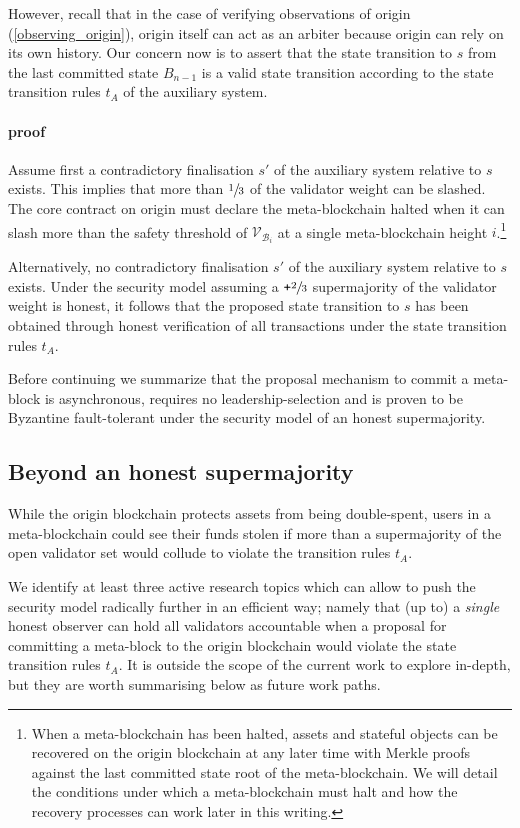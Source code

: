 \documentclass[12pt,a4paper]{article}
\begin{document}
However, recall that in the case of verifying observations of origin (\ref{observing_origin}), origin itself can act as an arbiter because origin can rely on its own history.
Our concern now is to assert that the state transition to $s$ from the last committed state $B_{n-1}$ is a valid state transition according to the state transition rules $t_A$ of the auxiliary system.

\paragraph{proof} Assume first a contradictory finalisation $s'$ of the auxiliary system relative to $s$ exists. This implies that more than $\sfrac{1}{3}$ of the validator weight can be slashed.
The core contract on origin must declare the meta-blockchain halted when it can slash more than the safety threshold of $\mathcal{V}_{\mathcal{B}_i}$ at a single meta-blockchain height $i$.\footnote{When a meta-blockchain has been halted, assets and stateful objects can be recovered on the origin blockchain at any later time with Merkle proofs against the last committed state root of the meta-blockchain.
We will detail the conditions under which a meta-blockchain must halt and how the recovery processes can work later in this writing.}

Alternatively, no contradictory finalisation $s'$ of the auxiliary system relative to $s$ exists.
Under the security model assuming a $\texttt{+}\sfrac{2}{3}$ supermajority of the validator weight is honest, it follows that the proposed state transition to $s$ has been obtained through honest verification of all transactions under the state transition rules $t_A$.

Before continuing we summarize that the proposal mechanism to commit a meta-block is asynchronous, requires no leadership-selection and is proven to be Byzantine fault-tolerant under the security model of an honest supermajority.

\subsection{Beyond an honest supermajority}

While the origin blockchain protects assets from being double-spent, users in a meta-blockchain could see their funds stolen if more than a supermajority of the open validator set would collude to violate the transition rules $t_A$. 

We identify at least three active research topics which can allow to push the security model radically further in an efficient way; namely that (up to) a \emph{single} honest observer can hold all validators accountable when a proposal for committing a meta-block to the origin blockchain would violate the state transition rules $t_A$.
It is outside the scope of the current work to explore in-depth, but they are worth summarising below as future work paths.
\end{document}
